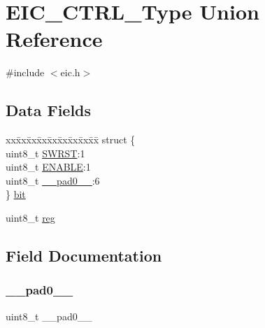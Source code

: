 \hypertarget{union_e_i_c___c_t_r_l___type}{}\section{E\+I\+C\+\_\+\+C\+T\+R\+L\+\_\+\+Type Union Reference}
\label{union_e_i_c___c_t_r_l___type}


{\ttfamily \#include $<$eic.\+h$>$}

\subsection*{Data Fields}
\begin{DoxyCompactItemize}
\item 
\begin{tabbing}
xx\=xx\=xx\=xx\=xx\=xx\=xx\=xx\=xx\=\kill
struct \{\\
\>uint8\_t \mbox{\hyperlink{union_e_i_c___c_t_r_l___type_a9334d5ac0548802c90a8129c52c8e490}{SWRST}}:1\\
\>uint8\_t \mbox{\hyperlink{union_e_i_c___c_t_r_l___type_a2b3662f1b123463ae1a23c1f324e5cc5}{ENABLE}}:1\\
\>uint8\_t \mbox{\hyperlink{union_e_i_c___c_t_r_l___type_a8b4eebe79ded0459acec2f4950102ba3}{\_\_pad0\_\_}}:6\\
\} \mbox{\hyperlink{union_e_i_c___c_t_r_l___type_ae0e7852e1f79d0e5824614b5381ee9ea}{bit}}\\

\end{tabbing}\item 
uint8\+\_\+t \mbox{\hyperlink{union_e_i_c___c_t_r_l___type_a9428adc9af4653a2050e2536b55dec8d}{reg}}
\end{DoxyCompactItemize}


\subsection{Field Documentation}
\mbox{\label{union_e_i_c___c_t_r_l___type_a8b4eebe79ded0459acec2f4950102ba3}} 
\subsubsection{\texorpdfstring{\_\_pad0\_\_}{\_\_pad0\_\_}}
{\footnotesize\ttfamily uint8\+\_\+t \+\_\+\+\_\+pad0\+\_\+\+\_\+}

